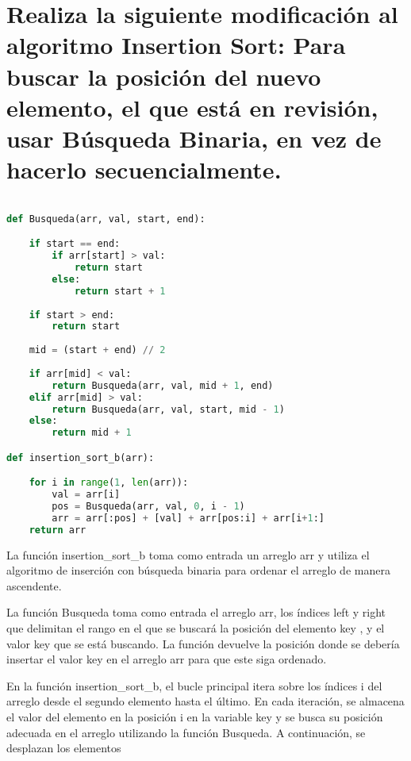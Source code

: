 \section{Realiza la siguiente modificación al algoritmo Insertion Sort:
Para buscar la posición del nuevo elemento, el que está en revisión,
usar Búsqueda Binaria, en vez de hacerlo secuencialmente.}

\begin{lstlisting}[language = python]

def Busqueda(arr, val, start, end):

    if start == end:
        if arr[start] > val:
            return start
        else:
            return start + 1
    
    if start > end:
        return start
    
    mid = (start + end) // 2
    
    if arr[mid] < val:
        return Busqueda(arr, val, mid + 1, end)
    elif arr[mid] > val:
        return Busqueda(arr, val, start, mid - 1)
    else:
        return mid + 1

def insertion_sort_b(arr):

    for i in range(1, len(arr)):
        val = arr[i]
        pos = Busqueda(arr, val, 0, i - 1)
        arr = arr[:pos] + [val] + arr[pos:i] + arr[i+1:]
    return arr

\end{lstlisting}

La función insertion\_sort\_b toma como entrada un arreglo arr y utiliza el algoritmo de inserción con búsqueda binaria para ordenar el arreglo de manera ascendente.

La función Busqueda toma como entrada el arreglo arr, los índices left y right que delimitan el rango en el que se buscará la posición del elemento key , y el valor key que se está buscando. La función devuelve la posición donde se debería insertar el valor key en el arreglo arr para que este siga ordenado.

En la función insertion\_sort\_b, el bucle principal itera sobre los índices i del arreglo desde el segundo elemento hasta el último. En cada iteración, se almacena el valor del elemento en la posición i en la variable key y se busca su posición adecuada en el arreglo utilizando la función Busqueda. A continuación, se desplazan los elementos

